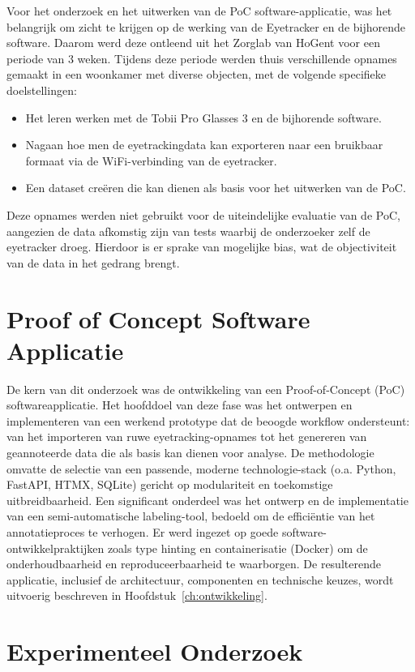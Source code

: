 Voor het onderzoek en het uitwerken van de PoC software-applicatie, was het belangrijk om zicht te krijgen op de werking van de Eyetracker en de bijhorende software.
Daarom werd deze ontleend uit het Zorglab van HoGent voor een periode van 3 weken. 
Tijdens deze periode werden thuis verschillende opnames gemaakt in een woonkamer met diverse objecten, met de volgende specifieke doelstellingen:
\begin{itemize}
    \item Het leren werken met de Tobii Pro Glasses 3 en de bijhorende software.
    \item Nagaan hoe men de eyetrackingdata kan exporteren naar een bruikbaar formaat via de WiFi-verbinding van de eyetracker.
    \item Een dataset creëren die kan dienen als basis voor het uitwerken van de PoC.
\end{itemize}
Deze opnames werden niet gebruikt voor de uiteindelijke evaluatie van de PoC, aangezien de data afkomstig zijn van tests waarbij de onderzoeker zelf de eyetracker droeg.
Hierdoor is er sprake van mogelijke bias, wat de objectiviteit van de data in het gedrang brengt.

\section{Proof of Concept Software Applicatie}

De kern van dit onderzoek was de ontwikkeling van een Proof-of-Concept (PoC) softwareapplicatie. 
Het hoofddoel van deze fase was het ontwerpen en implementeren van een werkend prototype dat de beoogde workflow ondersteunt: van het importeren van ruwe eyetracking-opnames tot het genereren van geannoteerde data die als basis kan dienen voor analyse. 
De methodologie omvatte de selectie van een passende, moderne technologie-stack (o.a. Python, FastAPI, HTMX, SQLite) gericht op modulariteit en toekomstige uitbreidbaarheid. 
Een significant onderdeel was het ontwerp en de implementatie van een semi-automatische labeling-tool, bedoeld om de efficiëntie van het annotatieproces te verhogen. 
Er werd ingezet op goede software-ontwikkelpraktijken zoals type hinting en containerisatie (Docker) om de onderhoudbaarheid en reproduceerbaarheid te waarborgen. 
De resulterende applicatie, inclusief de architectuur, componenten en technische keuzes, wordt uitvoerig beschreven in Hoofdstuk~\ref{ch:ontwikkeling}.

\section{Experimenteel Onderzoek}

